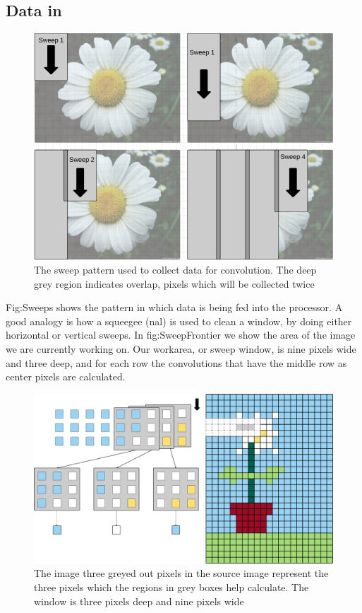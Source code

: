 \subsection{Data in}
\begin{figure}[h!]
    \includegraphics[width=\linewidth]{img/Sweeps.png}
    \caption{The sweep pattern used to collect data for convolution. The deep grey region indicates overlap, pixels which will be collected twice}
    \label{fig:Sweeps}
\end{figure}
Fig:Sweeps shows the pattern in which data is being fed into the processor.
A good analogy is how a squeegee (nal) is used to clean a window, by doing either horizontal or vertical sweeps.
In fig:SweepFrontier we show the area of the image we are currently working on.
Our workarea, or sweep window, is nine pixels wide and three deep, and for each row the convolutions that have the middle row as center pixels are calculated.
\begin{figure}[h!]
    \includegraphics[width=\linewidth]{img/FeedPattern.png}
    \caption{The image three greyed out pixels in the source image represent the three pixels which the regions in grey boxes help calculate. The window is three pixels deep and nine pixels wide}
    \label{fig:SweepFrontier}
\end{figure}

